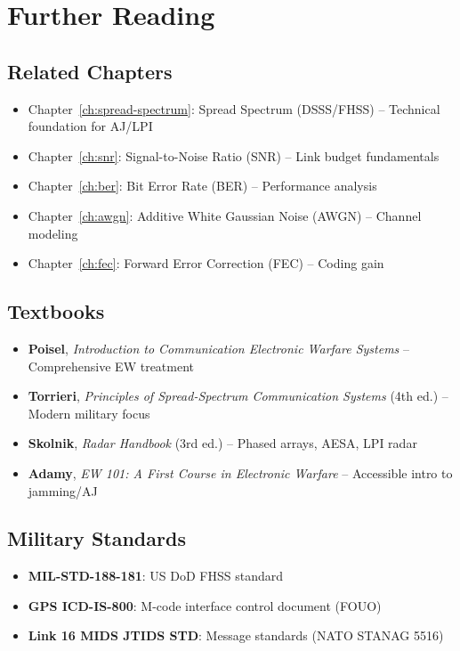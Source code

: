 \section{Further Reading}

\subsection{Related Chapters}

\begin{itemize}
\item Chapter~\ref{ch:spread-spectrum}: Spread Spectrum (DSSS/FHSS) -- Technical foundation for AJ/LPI
\item Chapter~\ref{ch:snr}: Signal-to-Noise Ratio (SNR) -- Link budget fundamentals
\item Chapter~\ref{ch:ber}: Bit Error Rate (BER) -- Performance analysis
\item Chapter~\ref{ch:awgn}: Additive White Gaussian Noise (AWGN) -- Channel modeling
\item Chapter~\ref{ch:fec}: Forward Error Correction (FEC) -- Coding gain
\end{itemize}

\subsection{Textbooks}

\begin{itemize}
\item \textbf{Poisel}, \emph{Introduction to Communication Electronic Warfare Systems} -- Comprehensive EW treatment
\item \textbf{Torrieri}, \emph{Principles of Spread-Spectrum Communication Systems} (4th ed.) -- Modern military focus
\item \textbf{Skolnik}, \emph{Radar Handbook} (3rd ed.) -- Phased arrays, AESA, LPI radar
\item \textbf{Adamy}, \emph{EW 101: A First Course in Electronic Warfare} -- Accessible intro to jamming/AJ
\end{itemize}

\subsection{Military Standards}

\begin{itemize}
\item \textbf{MIL-STD-188-181}: US DoD FHSS standard
\item \textbf{GPS ICD-IS-800}: M-code interface control document (FOUO)
\item \textbf{Link 16 MIDS JTIDS STD}: Message standards (NATO STANAG 5516)
\end{itemize}
